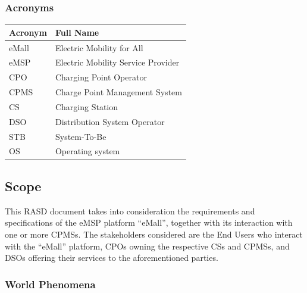 \documentclass[11pt]{article}
\begin{document}
\subsubsection{Acronyms}

\begin{table}[H]
    \centering
    \setlength{\tabcolsep}{18pt}
    \renewcommand{\arraystretch}{1.2}
    \begin{tabularx}{\textwidth}{|>{\centering\hsize=0.3\hsize}X|>{\hsize=1.7\hsize}X|}
        \hline
        \textbf{Acronym} & \textbf{Full Name} \\
        \hline
        eMall & Electric Mobility for All \\
        \hline
        eMSP & Electric Mobility Service Provider \\
        \hline
        CPO & Charging Point Operator \\
        \hline
        CPMS & Charge Point Management System \\
        \hline
        CS & Charging Station \\
        \hline
        DSO & Distribution System Operator \\
        \hline
        STB & System-To-Be \\
        \hline
        OS & Operating system \\
        \hline
    \end{tabularx}
    \label{tab:acronyms}
\end{table}

\subsection{Scope}

This RASD document takes into consideration the requirements and specifications of the eMSP platform “eMall”, together with its interaction with one or more CPMSs. The stakeholders considered are the End Users who interact with the “eMall” platform, CPOs owning the respective CSs and CPMSs, and DSOs offering their services to the aforementioned parties.

\subsubsection{World Phenomena}
\end{document}
